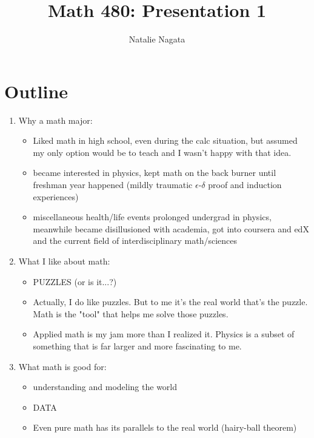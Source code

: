 \documentclass[11pt]{article}
\begin{document}
\author{Natalie Nagata}
\title{Math 480: Presentation 1}
\maketitle



\section*{Outline}

\begin{enumerate}
\item Why a math major:
\begin{itemize}
    \item Liked math in high school, even during the calc situation, but assumed my only option would be to teach and I wasn't happy with that idea.
    \item became interested in physics, kept math on the back burner until freshman year happened (mildly traumatic $\epsilon$-$\delta$ proof and induction experiences)
    \item miscellaneous health/life events prolonged undergrad in physics, meanwhile became disillusioned with academia, got into coursera and edX and the current field of interdisciplinary math/sciences 
\end{itemize}
\vspace{0.3cm}

\item What I like about math:
\begin{itemize}
    \item PUZZLES (or is it...?)
    \item Actually, I do like puzzles. But to me it's the real world that's the puzzle.  Math is  the "tool" that helps me solve those puzzles.
    \item Applied math is my jam more than I realized it.  Physics is  a subset of something that is far larger and more fascinating to me.
\end{itemize}

\item What math is good for:
\begin{itemize}
    \item understanding and modeling the world
    \item DATA
    \item Even pure math has its parallels to the real world (hairy-ball theorem)
\end{itemize}


\end{enumerate}
\end{document}
